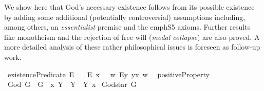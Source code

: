 %
\begin{isabellebody}%
%
%
\isadelimtheory
%
\endisadelimtheory
%
\isatagtheory
%
\endisatagtheory
{\isafoldtheory}%
%
\isadelimtheory
%
\endisadelimtheory
%
\isamarkuptrue%
%
\begin{isamarkuptext}%
We show here that God's necessary existence follows from its possible existence by adding some
 additional (potentially controversial) assumptions including, among others, an \emph{essentialist} premise and the emph{S5} axioms.
 Further results like monotheism and the rejection of free will (\emph{modal collapse}) are also proved.
 A more detailed analysis of these rather philosophical issues is foreseen as follow-up work.%
\end{isamarkuptext}\isamarkuptrue%
%
\isamarkuptrue%
\isamarkupfalse%
\ existencePredicate{\isacharcolon}{\isacharcolon}{\isachardoublequoteopen}{\isasymup}{\isasymlangle}{\isasymzero}{\isasymrangle}{\isachardoublequoteclose}\ {\isacharparenleft}{\isachardoublequoteopen}E{\isacharbang}{\isachardoublequoteclose}{\isacharparenright}\ \isanewline
\ \ {\isachardoublequoteopen}E{\isacharbang}\ x\ \ {\isasymequiv}\ {\isacharparenleft}{\isasymlambda}w{\isachardot}\ {\isacharparenleft}\isactrlbold {\isasymexists}\isactrlsup Ey{\isachardot}\ y\isactrlbold {\isasymapprox}x{\isacharparenright}\ w{\isacharparenright}{\isachardoublequoteclose}\ \isanewline
{}\isamarkupfalse%
\ positiveProperty{\isacharcolon}{\isacharcolon}{\isachardoublequoteopen}{\isasymup}{\isasymlangle}{\isasymup}{\isasymlangle}{\isasymzero}{\isasymrangle}{\isasymrangle}{\isachardoublequoteclose}\ {\isacharparenleft}{\isachardoublequoteopen}{\isasymP}{\isachardoublequoteclose}{\isacharparenright}\isanewline
\ \ \isanewline
{}\isamarkupfalse%
\ God{\isacharcolon}{\isacharcolon}{\isachardoublequoteopen}{\isasymup}{\isasymlangle}{\isasymzero}{\isasymrangle}{\isachardoublequoteclose}\ {\isacharparenleft}{\isachardoublequoteopen}G{\isachardoublequoteclose}{\isacharparenright}\ \ {\isachardoublequoteopen}G\ {\isasymequiv}\ {\isacharparenleft}{\isasymlambda}x{\isachardot}\ \isactrlbold {\isasymforall}Y{\isachardot}\ {\isasymP}\ Y\ \isactrlbold {\isasymrightarrow}\ Y\ x{\isacharparenright}{\isachardoublequoteclose}\isanewline
{}\isamarkupfalse%
\ God{\isacharunderscore}star{\isacharcolon}{\isacharcolon}{\isachardoublequoteopen}{\isasymup}{\isasymlangle}{\isasymzero}{\isasymrangle}{\isachardoublequoteclose}\ {\isacharparenleft}{\isachardoublequoteopen}G{\isacharasterisk}{\isachardoublequoteclose}{\isacharparenright}\ \isanewline

\end{isabellebody}
